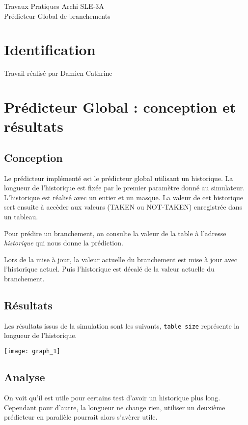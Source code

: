 \documentclass[a4paper]{article}
\begin{document}
\begin{center}
\large
Travaux Pratiques Archi SLE-3A\\
\LARGE
Prédicteur Global de branchements\\
\large

\end{center}
\section{Identification}
Travail réalisé par Damien Cathrine

\section{Prédicteur Global : conception et résultats}
\subsection{Conception}
Le prédicteur implémenté est le prédicteur global utilisant un historique.
La longueur de l'historique est fixée par le premier paramètre donné au simulateur.
L'historique est réalisé avec un entier et un masque. La valeur de cet historique sert
ensuite à accèder aux valeurs (TAKEN ou NOT-TAKEN) enregistrée dans un tableau.

Pour prédire un branchement, on consulte la valeur de la table à l'adresse
\textit{historique} qui nous donne la prédiction.

Lors de la mise à jour, la valeur actuelle du branchement est mise à jour avec l'historique actuel.
Puis l'historique est décalé de la valeur actuelle du branchement.

\subsection{Résultats}
Les résultats issus de la simulation sont les suivants,
\texttt{table size} représente la longueur de l'historique.
\par
\begin{minipage}{.48\linewidth}
\texttt{[image: graph\_1]}
\end{minipage}%

\subsection{Analyse}
On voit qu'il est utile pour certains test d'avoir un historique plus long.
Cependant pour d'autre, la longueur ne change rien, utiliser un deuxième prédicteur
en parallèle pourrait alors s'avèrer utile.
\end{document}
